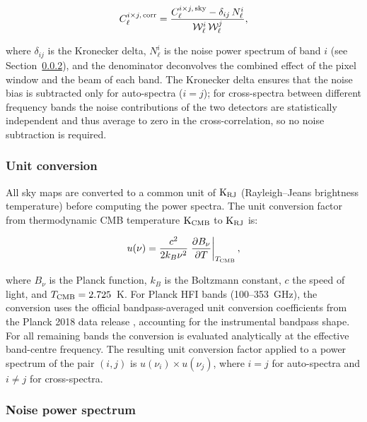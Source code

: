 \begin{equation}
    \label{eq:corrected_cl}
    C_{\ell}^{i \times j,\,\rm corr} = \frac{C_{\ell}^{i \times j,\,\rm sky} - \delta_{ij}\,N_{\ell}^{i}}{\mathcal{W}_\ell^i\,\mathcal{W}_\ell^j},
\end{equation}

where $\delta_{ij}$ is the Kronecker delta, $N_\ell^i$ is the noise power spectrum of band $i$ (see Section~\ref{sec:noise_correction}), and the denominator deconvolves the combined effect of the pixel window and the beam of each band. The Kronecker delta ensures that the noise bias is subtracted only for auto-spectra ($i = j$); for cross-spectra between different frequency bands the noise contributions of the two detectors are statistically independent and thus average to zero in the cross-correlation, so no noise subtraction is required.

\subsubsection{Unit conversion}
\label{sec:unit_conversion}

All sky maps are converted to a common unit of $\mathrm{K}_{\rm RJ}$ (Rayleigh--Jeans brightness temperature) before computing the power spectra. The unit conversion factor from thermodynamic CMB temperature $\mathrm{K}_{\rm CMB}$ to $\mathrm{K}_{\rm RJ}$ is:

\begin{equation}
    u(\nu) = \frac{c^2}{2 k_B \nu^2} \left.\frac{\partial B_\nu}{\partial T}\right|_{T_{\rm CMB}},
\end{equation}

where $B_\nu$ is the Planck function, $k_B$ is the Boltzmann constant, $c$ the speed of light, and $T_{\rm CMB} = 2.725$~K. For Planck HFI bands (100--353~GHz), the conversion uses the official bandpass-averaged unit conversion coefficients from the Planck 2018 data release \citep{Planck_2018III}, accounting for the instrumental bandpass shape. For all remaining bands the conversion is evaluated analytically at the effective band-centre frequency. The resulting unit conversion factor applied to a power spectrum of the pair $(i,j)$ is $u(\nu_i) \times u(\nu_j)$, where $i = j$ for auto-spectra and $i \neq j$ for cross-spectra.

\subsubsection{Noise power spectrum}
\label{sec:noise_correction}

